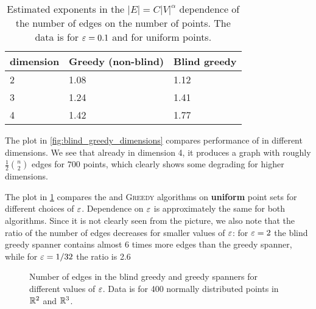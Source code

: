 \begin{table}[b]
\begin{tabular}{|l|l|l|}
\hline
dimension & \textbf{Greedy (non-blind)} & \textbf{Blind greedy} \\ \hline
2         &         1.08                &  1.12                 \\ \hline
3         &         1.24                &  1.41                \\ \hline
4         &         1.42                &  1.77                 \\ \hline
\end{tabular}
\caption{Estimated exponents in the $|E|= C |V|^\alpha$ dependence of the number of edges
on the number of points. The data is for $\varepsilon = 0.1$ and for uniform points.}
\label{tbl:regr_coeff_spanner}
\end{table}


The plot in \cref{fig:blind_greedy_dimensions}
compares performance of \bgrdy in different dimensions.
We see that already in dimension 4, it produces a graph with roughly $\frac{1}{2}\binom{n}{2}$
edges for $700$ points, which clearly shows some degrading for higher dimensions.


The plot in \cref{fig:spanner_eps_dependence}
compares the \bgrdy and \textsc{Greedy} algorithms
on \textbf{uniform} point sets for different choices of $\varepsilon$. Dependence on $\varepsilon$
is approximately the same for both algorithms. Since it is not clearly seen from the picture, we also note
that the ratio of the number of edges decreases for
smaller values of $\varepsilon$: 
for $\varepsilon = 2$ the blind greedy spanner contains almost 6 times more edges than the greedy spanner,
while for $\varepsilon = 1/32$ the ratio is 2.6


\begin{figure}[ht]
        \caption{Number of edges in the blind greedy and greedy spanners for different values of $\varepsilon$. Data is for 400 normally distributed points in $\mathbb{R}^2$ and $\mathbb{R}^3$.}
        \label{fig:spanner_eps_dependence}
\end{figure}


